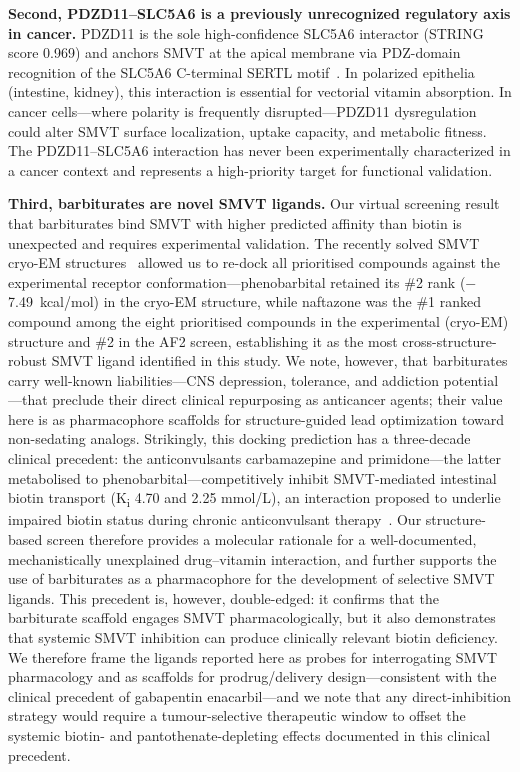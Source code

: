 \documentclass[10pt,letterpaper]{article}
\begin{document}
\noindent\textbf{Second, PDZD11--SLC5A6 is a previously unrecognized regulatory axis in cancer.} PDZD11 is the sole high-confidence SLC5A6 interactor (STRING score 0.969) and anchors SMVT at the apical membrane via PDZ-domain recognition of the SLC5A6 C-terminal SERTL motif~\cite{nabokina2011}. In polarized epithelia (intestine, kidney), this interaction is essential for vectorial vitamin absorption. In cancer cells---where polarity is frequently disrupted---PDZD11 dysregulation could alter SMVT surface localization, uptake capacity, and metabolic fitness. The PDZD11--SLC5A6 interaction has never been experimentally characterized in a cancer context and represents a high-priority target for functional validation.

\noindent\textbf{Third, barbiturates are novel SMVT ligands.} Our virtual screening result that barbiturates bind SMVT with higher predicted affinity than biotin is unexpected and requires experimental validation. The recently solved SMVT cryo-EM structures~\cite{zhen2026} allowed us to re-dock all prioritised compounds against the experimental receptor conformation---phenobarbital retained its \#2 rank ($-$7.49~kcal/mol) in the cryo-EM structure, while naftazone was the \#1 ranked compound among the eight prioritised compounds in the experimental (cryo-EM) structure and \#2 in the AF2 screen, establishing it as the most cross-structure-robust SMVT ligand identified in this study. We note, however, that barbiturates carry well-known liabilities---CNS depression, tolerance, and addiction potential---that preclude their direct clinical repurposing as anticancer agents; their value here is as pharmacophore scaffolds for structure-guided lead optimization toward non-sedating analogs. Strikingly, this docking prediction has a three-decade clinical precedent: the anticonvulsants carbamazepine and primidone---the latter metabolised to phenobarbital---competitively inhibit SMVT-mediated intestinal biotin transport (K\textsubscript{i} 4.70 and 2.25 mmol/L), an interaction proposed to underlie impaired biotin status during chronic anticonvulsant therapy~\cite{said1989}. Our structure-based screen therefore provides a molecular rationale for a well-documented, mechanistically unexplained drug--vitamin interaction, and further supports the use of barbiturates as a pharmacophore for the development of selective SMVT ligands. This precedent is, however, double-edged: it confirms that the barbiturate scaffold engages SMVT pharmacologically, but it also demonstrates that systemic SMVT inhibition can produce clinically relevant biotin deficiency. We therefore frame the ligands reported here as probes for interrogating SMVT pharmacology and as scaffolds for prodrug/delivery design---consistent with the clinical precedent of gabapentin enacarbil---and we note that any direct-inhibition strategy would require a tumour-selective therapeutic window to offset the systemic biotin- and pantothenate-depleting effects documented in this clinical precedent.
\end{document}
